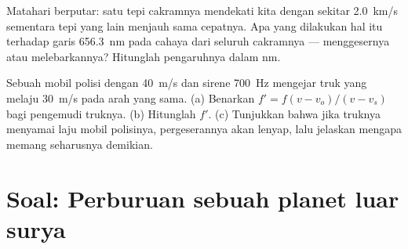 \begin{exercise}[$\star\star\star$]\label{exo:g12:doppler-effect:14}
Matahari berputar: satu tepi cakramnya mendekati kita dengan sekitar \qty{2.0}{km/s}
sementara tepi yang lain menjauh sama cepatnya. Apa yang dilakukan hal itu terhadap garis
\qty{656.3}{nm} pada cahaya dari seluruh cakramnya --- menggesernya atau melebarkannya?
Hitunglah pengaruhnya dalam \unit{nm}.
\end{exercise}

\begin{exercise}[$\star\star\star$]\label{exo:g12:doppler-effect:15}
Sebuah mobil polisi dengan \qty{40}{m/s} dan sirene \qty{700}{Hz} mengejar truk yang melaju
\qty{30}{m/s} pada arah yang sama. (a) Benarkan $f' = f(v - v_o)/(v - v_s)$ bagi pengemudi
truknya. (b) Hitunglah $f'$. (c) Tunjukkan bahwa jika truknya menyamai laju mobil
polisinya, pergeserannya akan lenyap, lalu jelaskan mengapa memang seharusnya demikian.
\end{exercise}

\section{Soal: Perburuan sebuah planet luar surya}

